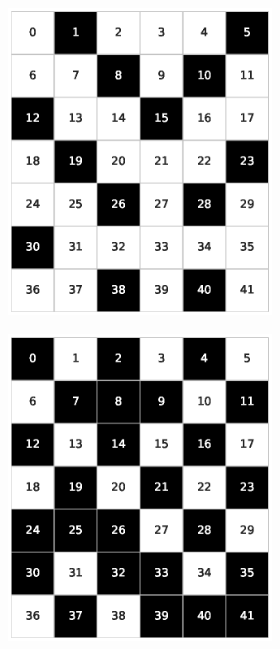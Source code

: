 \begin{figure}[h!]
\begin{subfigure}[b]{\textwidth}
\begin{subfigure}[b]{0.20\textwidth}
            \includegraphics[width=\columnwidth]{images/Tai42c_7x6_30.eps}
        \end{subfigure}
        \hspace{3em}
        \begin{subfigure}[b]{0.20\textwidth}
            \includegraphics[width=\columnwidth]{images/Tai42c_7x6_60.eps}

\end{subfigure}
\end{subfigure}
\end{figure}

